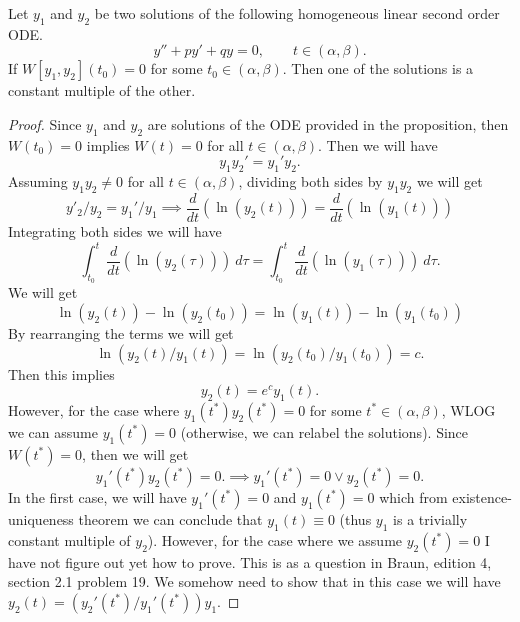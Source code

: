 \begin{proposition}
	Let $ y_1 $ and $ y_2 $ be two solutions of the following homogeneous linear second order ODE.
	\[ y'' + py' + qy = 0, \qquad t \in (\alpha,\beta). \]
	If $ W[y_1,y_2](t_0) = 0 $ for some $ t_0 \in (\alpha,\beta) $. Then one of the solutions is a constant multiple of the other. 
\end{proposition}
\begin{proof}
	Since $ y_1 $ and $ y_2 $ are solutions of the ODE provided in the proposition, then $ W(t_0)= 0 $ implies $ W(t)=0 $ for all $ t \in (\alpha,\beta) $. Then we will have
	\[ y_1y_2' = y_1' y_2. \]
	Assuming $ y_1y_2 \neq 0 $ for all $ t \in (\alpha,\beta) $, dividing both sides by $ y_1y_2 $ we will get
	\[ y'_2/y_2 = y_1'/y_1 \implies \frac{d}{dt} (\ln(y_2(t))) = \frac{d}{dt} (\ln(y_1(t)))\]
	Integrating both sides we will have
	\[ \int_{t_0}^{t}\frac{d}{dt} (\ln(y_2(\tau)))\ d\tau = \int_{t_0}^{t} \frac{d}{dt} (\ln(y_1(\tau)))\ d\tau. \]
	We will get
	\[ \ln(y_2(t)) - \ln(y_2(t_0)) = \ln(y_1(t)) - \ln(y_1(t_0))  \]
	By rearranging the terms we will get
	\[ \ln(y_2(t)/y_1(t))  = \ln(y_2(t_0)/y_1(t_0)) = c. \]
	Then this implies 
	\[ y_2(t) = e^c y_1(t). \]
	However, for the case where $ y_1(t^*)y_2(t^*) = 0 $ for some $ t^* \in (\alpha,\beta)$, WLOG we can assume $ y_1(t^*) = 0 $ (otherwise, we can relabel the solutions). Since $ W(t^*) = 0 $, then we will get
	\[ y_1'(t^*) y_2(t^*) = 0. \implies y_1'(t^*) = 0 \vee y_2(t^*) = 0.\]
	In the first case, we will have $ y_1'(t^*) = 0 $ and $ y_1(t^*) = 0 $ which from existence-uniqueness theorem we can conclude that $ y_1(t) \equiv 0 $ (thus $ y_1 $ is a trivially constant multiple of $ y_2 $). However, for the case where we assume $ y_2(t^*) = 0 $ I have not figure out yet how to prove. This is as a question in Braun, edition 4, section 2.1 problem 19. We somehow need to show that in this case we will have $ y_2(t) = (y_2'(t^*)/y_1'(t^*)) y_1.‍ $
\end{proof}
